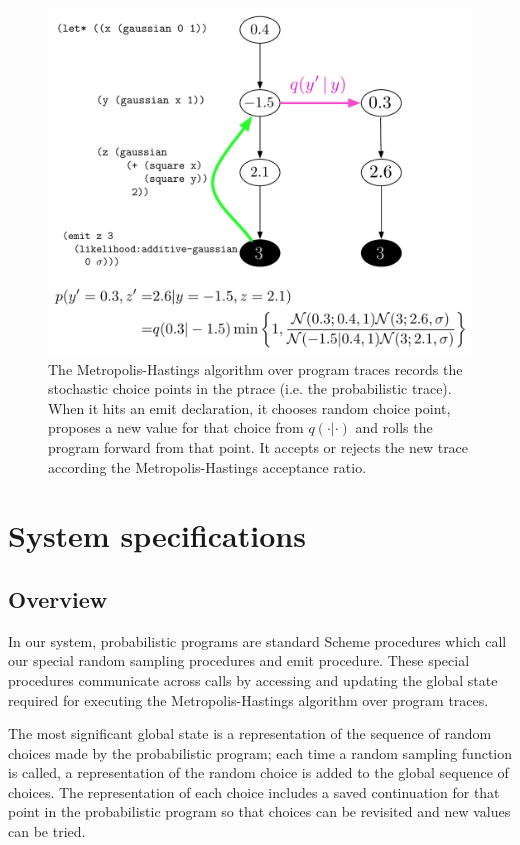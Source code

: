 \documentclass{article}
\begin{document}
\begin{figure}
\includegraphics[width=\textwidth]{figures/ptrace.pdf}
\caption{The Metropolis-Hastings algorithm over program traces records the
stochastic choice points in the ptrace (i.e. the probabilistic trace). When it
hits an emit declaration, it chooses random choice point, proposes a new
value for that choice from $q(\cdot | \cdot)$ and rolls the program forward from
that point. It accepts or rejects the new trace according the
Metropolis-Hastings acceptance ratio.} \label{fig:ptrace}
\end{figure}



\section{System specifications}
\subsection{Overview}

In our system, probabilistic programs are standard Scheme procedures which call
our special random sampling procedures and emit procedure. These special
procedures communicate across calls by accessing and updating the global state
required for executing the Metropolis-Hastings algorithm over program traces.

The most significant global state is a representation of the sequence of random
choices made by the probabilistic program; each time a random sampling function
is called, a representation of the random choice is added to the global
sequence of choices. The representation of each choice includes a saved
continuation for that point in the probabilistic program so that choices can be
revisited and new values can be tried.
\end{document}
